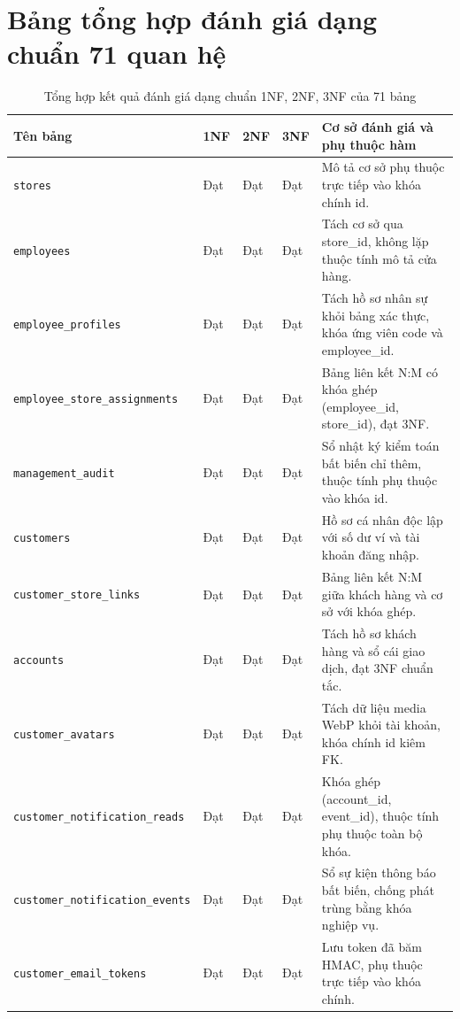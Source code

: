 \section{Bảng tổng hợp đánh giá dạng chuẩn 71 quan hệ}
\begin{table}[htbp]
\centering
\caption{Tổng hợp kết quả đánh giá dạng chuẩn 1NF, 2NF, 3NF của 71 bảng}
\label{tab:normalization-71}
\scriptsize
\begin{tabularx}{\textwidth}{|>{\raggedright\arraybackslash}p{3.2cm}|>{\centering\arraybackslash}p{1.0cm}|>{\centering\arraybackslash}p{1.0cm}|>{\centering\arraybackslash}p{1.6cm}|X|}
\hline
\textbf{Tên bảng} & \textbf{1NF} & \textbf{2NF} & \textbf{3NF} & \textbf{Cơ sở đánh giá và phụ thuộc hàm} \\
\hline
\texttt{stores} & Đạt & Đạt & Đạt & Mô tả cơ sở phụ thuộc trực tiếp vào khóa chính id. \\
\hline
\texttt{employees} & Đạt & Đạt & Đạt & Tách cơ sở qua store_id, không lặp thuộc tính mô tả cửa hàng. \\
\hline
\texttt{employee\_profiles} & Đạt & Đạt & Đạt & Tách hồ sơ nhân sự khỏi bảng xác thực, khóa ứng viên code và employee_id. \\
\hline
\texttt{employee\_store\_assignments} & Đạt & Đạt & Đạt & Bảng liên kết N:M có khóa ghép (employee_id, store_id), đạt 3NF. \\
\hline
\texttt{management\_audit} & Đạt & Đạt & Đạt & Sổ nhật ký kiểm toán bất biến chỉ thêm, thuộc tính phụ thuộc vào khóa id. \\
\hline
\texttt{customers} & Đạt & Đạt & Đạt & Hồ sơ cá nhân độc lập với số dư ví và tài khoản đăng nhập. \\
\hline
\texttt{customer\_store\_links} & Đạt & Đạt & Đạt & Bảng liên kết N:M giữa khách hàng và cơ sở với khóa ghép. \\
\hline
\texttt{accounts} & Đạt & Đạt & Đạt & Tách hồ sơ khách hàng và sổ cái giao dịch, đạt 3NF chuẩn tắc. \\
\hline
\texttt{customer\_avatars} & Đạt & Đạt & Đạt & Tách dữ liệu media WebP khỏi tài khoản, khóa chính id kiêm FK. \\
\hline
\texttt{customer\_notification\_reads} & Đạt & Đạt & Đạt & Khóa ghép (account_id, event_id), thuộc tính phụ thuộc toàn bộ khóa. \\
\hline
\texttt{customer\_notification\_events} & Đạt & Đạt & Đạt & Sổ sự kiện thông báo bất biến, chống phát trùng bằng khóa nghiệp vụ. \\
\hline
\texttt{customer\_email\_tokens} & Đạt & Đạt & Đạt & Lưu token đã băm HMAC, phụ thuộc trực tiếp vào khóa chính. \\

\end{tabularx}
\end{table}
